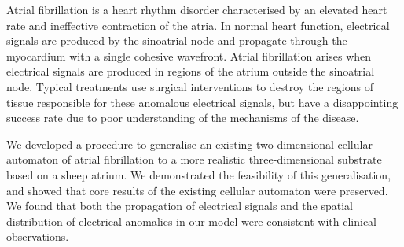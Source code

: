 Atrial fibrillation is a heart rhythm disorder characterised by an elevated heart rate and ineffective contraction of the atria. In normal heart function, electrical signals are produced by the sinoatrial node and propagate through the myocardium with a single cohesive wavefront. Atrial fibrillation arises when electrical signals are produced in regions of the atrium outside the sinoatrial node. Typical treatments use surgical interventions to destroy the regions of tissue responsible for these anomalous electrical signals, but have a disappointing success rate due to poor understanding of the mechanisms of the disease. 

We developed a procedure to generalise an existing two-dimensional cellular automaton of atrial fibrillation to a more realistic three-dimensional substrate based on a sheep atrium. We demonstrated the feasibility of this generalisation, and showed that core results of the existing cellular automaton were preserved. 
We found that both the propagation of electrical signals and the spatial distribution of electrical anomalies in
our model were consistent with clinical observations.